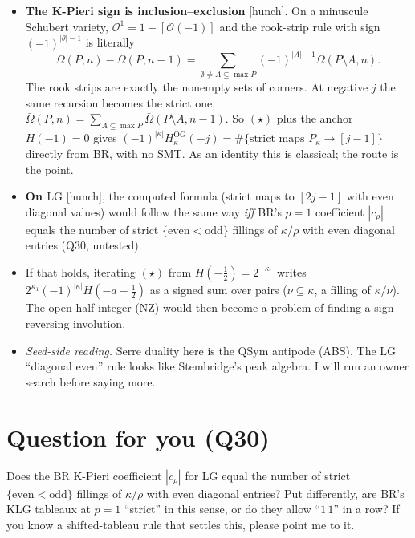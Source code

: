 \documentclass[10pt]{amsart}
\newcommand{\grade}[1]{\textsf{[#1]}}
\newcommand{\LG}{\mathrm{LG}}
\newcommand{\OG}{\mathrm{OG}}
\begin{document}
\begin{itemize}
\item \textbf{The K-Pieri sign is inclusion--exclusion} \grade{hunch}. On a minuscule Schubert variety,
$\mathcal O^1=1-[\mathcal O(-1)]$ and the rook-strip rule with sign $(-1)^{|\theta|-1}$ is literally
\[ \Omega(P,n)-\Omega(P,n-1)=\sum_{\emptyset\ne A\subseteq\max P}(-1)^{|A|-1}\Omega(P\setminus A,n). \]
The rook strips are exactly the nonempty sets of corners. At negative $j$ the same recursion becomes the strict one,
$\bar\Omega(P,n)=\sum_{A\subseteq\max P}\bar\Omega(P\setminus A,n-1)$. So $(\star)$ plus the anchor $H(-1)=0$ gives
$(-1)^{|\kappa|}H^{\OG}_\kappa(-j)=\#\{\text{strict maps }P_\kappa\to[j-1]\}$ directly from BR, with no SMT. As an identity this is
classical; the route is the point.
\item \textbf{On $\LG$} \grade{hunch}, the computed formula (strict maps to $[2j-1]$ with even diagonal values) would follow
the same way \emph{iff} BR's $p=1$ coefficient $|c_\rho|$ equals the number of strict $\{\text{even}<\text{odd}\}$ fillings of
$\kappa/\rho$ with even diagonal entries (Q30, untested).
\item If that holds, iterating $(\star)$ from $H(-\tfrac12)=2^{-\kappa_1}$ writes $2^{\kappa_1}(-1)^{|\kappa|}H(-a-\tfrac12)$ as a
signed sum over pairs ($\nu\subseteq\kappa$, a filling of $\kappa/\nu$). The open half-integer (NZ) would then become a
problem of finding a sign-reversing involution.
\item \emph{Seed-side reading.} Serre duality here is the QSym antipode (ABS). The $\LG$ ``diagonal even'' rule looks like
Stembridge's peak algebra. I will run an owner search before saying more.
\end{itemize}

\section{Question for you (Q30)}

Does the BR K-Pieri coefficient $|c_\rho|$ for $\LG$ equal the number of strict $\{\text{even}<\text{odd}\}$ fillings of
$\kappa/\rho$ with even diagonal entries? Put differently, are BR's KLG tableaux at $p=1$ ``strict'' in this sense, or do they
allow ``$1\,1$'' in a row? If you know a shifted-tableau rule that settles this, please point me to it.
\end{document}
